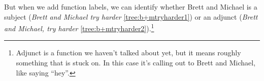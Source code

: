 \ea{} \label{tree:b+mtryharder}
\z

But when we add function labels, we can identify whether Brett and Michael is a subject (\textit{Brett and Michael try harder} \ref{tree:b+mtryharder1}) or an adjunct (\textit{Brett and Michael, try harder} \ref{tree:b+mtryharder2}).\footnote{Adjunct is a function we haven't talked about yet, but it means roughly something that is stuck on. In this case it's calling out to Brett and Michael, like saying ``hey''.}

\ea
    \ea{} \label{tree:b+mtryharder1}
    \ex{} \label{tree:b+mtryharder2}
    \z
\z

